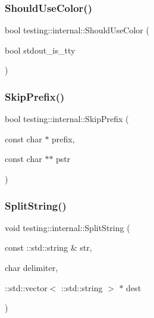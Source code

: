 \mbox{\label{namespacetesting_1_1internal_ac1db1b4603967a6c4404f31cbbac31a6}} 
\subsubsection{\texorpdfstring{ShouldUseColor()}{ShouldUseColor()}}
{\footnotesize\ttfamily bool testing\+::internal\+::\+Should\+Use\+Color (\begin{DoxyParamCaption}\item[{bool}]{stdout\+\_\+is\+\_\+tty }\end{DoxyParamCaption})}

\mbox{\label{namespacetesting_1_1internal_a244d9a3765727306b597b8992ab84036}} 
\subsubsection{\texorpdfstring{SkipPrefix()}{SkipPrefix()}}
{\footnotesize\ttfamily bool testing\+::internal\+::\+Skip\+Prefix (\begin{DoxyParamCaption}\item[{const char $\ast$}]{prefix,  }\item[{const char $\ast$$\ast$}]{pstr }\end{DoxyParamCaption})}

\mbox{\label{namespacetesting_1_1internal_a8eb8eddf760375a490e007b20777ec56}} 
\subsubsection{\texorpdfstring{SplitString()}{SplitString()}}
{\footnotesize\ttfamily void testing\+::internal\+::\+Split\+String (\begin{DoxyParamCaption}\item[{const \+::std\+::string \&}]{str,  }\item[{char}]{delimiter,  }\item[{\+::std\+::vector$<$ \+::std\+::string $>$ $\ast$}]{dest }\end{DoxyParamCaption})}

